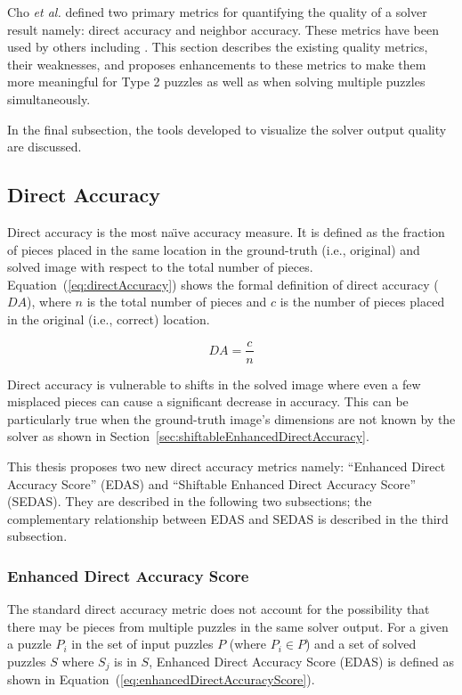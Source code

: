 \documentclass{report}
\def\eref#1{(\ref{#1})}
\begin{document}
Cho \textit{et al.} \cite{cho2010} defined two primary metrics for quantifying the quality of a solver result namely: direct accuracy and neighbor accuracy. These metrics have been used by others including \cite{sholomon2013, pomeranz2011, paikin2015, son2014, gallagher2012}.  This section describes the existing quality metrics, their weaknesses, and proposes enhancements to these metrics to make them more meaningful for Type 2 puzzles as well as when solving multiple puzzles simultaneously.

In the final subsection, the tools developed to visualize the solver output quality are discussed.

\subsection{Direct Accuracy}\label{sec:directAccuracy}

Direct accuracy is the most na\"{\i}ve accuracy measure.  It is defined as the fraction of pieces placed in the same location in the ground-truth (i.e., original) and solved image with respect to the total number of pieces.  Equation~\eref{eq:directAccuracy} shows the formal definition of direct accuracy ($DA$), where $n$ is the total number of pieces and $c$ is the number of pieces placed in the original (i.e., correct) location.

\begin{equation} \label{eq:directAccuracy}
DA = \frac{c}{n}
\end{equation}

Direct accuracy is vulnerable to shifts in the solved image where even a few misplaced pieces can cause a significant decrease in accuracy.  This can be particularly true when the ground-truth image's dimensions are not known by the solver as shown in Section~\ref{sec:shiftableEnhancedDirectAccuracy}.

This thesis proposes two new direct accuracy metrics namely: ``Enhanced Direct Accuracy Score'' (EDAS) and ``Shiftable Enhanced Direct Accuracy Score'' (SEDAS).  They are described in the following two subsections; the complementary relationship between EDAS and SEDAS is described in the third subsection.

\subsubsection{Enhanced Direct Accuracy Score}\label{sec:enhancedDirectAccuracyScore}

The standard direct accuracy metric does not account for the possibility that there may be pieces from multiple puzzles in the same solver output.  For a given a puzzle $P_i$ in the set of input puzzles $P$ (where $P_i \in P$) and a set of solved puzzles $S$ where $S_j$ is in $S$, Enhanced Direct Accuracy Score (EDAS) is defined as shown in Equation~\eref{eq:enhancedDirectAccuracyScore}.
\end{document}
